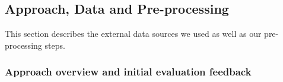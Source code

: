 \subsection{Approach, Data and Pre-processing}
\label{sec:overview}
This section describes the external data sources we used as well as our pre-processing steps.



\subsubsection{Approach overview and initial evaluation feedback}
\label{sec:approach_feedback}






